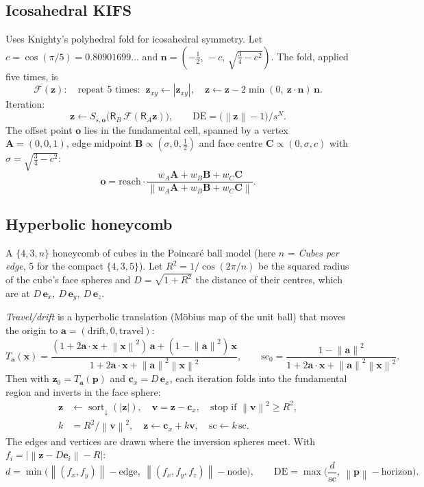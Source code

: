 \documentclass[10pt,a4paper]{article}
\newcommand{\vv}[1]{\mathbf{#1}}
\newcommand{\abs}[1]{\left|#1\right|}
\newcommand{\norm}[1]{\left\lVert#1\right\rVert}
\newcommand{\sortd}{\operatorname{sort}_{\downarrow}}
\newcommand{\Rot}{\mathsf{R}}
\newcommand{\DE}{\mathrm{DE}}
\newcommand{\ex}{\vv{e}_x}\newcommand{\ey}{\vv{e}_y}\newcommand{\ez}{\vv{e}_z}
\begin{document}
\subsection{Icosahedral KIFS}
Uses Knighty's polyhedral fold for icosahedral symmetry. Let $c=\cos(\pi/5)=0.80901699\ldots$ and
$\vv n=(-\tfrac12,\,-c,\,\sqrt{\tfrac34-c^2})$. The fold, applied five times, is
\begin{equation}
\mathcal F(\vv z):\quad\text{repeat 5 times: }\ \vv z_{xy}\leftarrow\abs{\vv z_{xy}},\quad \vv z\leftarrow\vv z-2\min(0,\ \vv z\!\cdot\!\vv n)\,\vv n.
\end{equation}
Iteration:
\begin{equation}\vv z\leftarrow S_{s,\vv o}\Big(\Rot_B\,\mathcal F(\Rot_A\vv z)\Big),\qquad\DE=\big(\norm{\vv z}-1\big)/s^{N}.
\end{equation}
The offset point $\vv o$ lies in the fundamental cell, spanned by a vertex $\vv A=(0,0,1)$, edge midpoint $\vv B\propto(\sigma,0,\tfrac12)$ and face centre $\vv C\propto(0,\sigma,c)$ with $\sigma=\sqrt{\tfrac34-c^2}$:
\begin{equation}\vv o=\mathrm{reach}\cdot\frac{w_A\vv A+w_B\vv B+w_C\vv C}{\norm{w_A\vv A+w_B\vv B+w_C\vv C}}.\end{equation}


\subsection{Hyperbolic honeycomb}
A $\{4,3,n\}$ honeycomb of cubes in the Poincar\'e ball model (here $n$ = \emph{Cubes per edge}, 5 for the compact $\{4,3,5\}$).
Let $R^2=1/\cos(2\pi/n)$ be the squared radius of the cube's face spheres and $D=\sqrt{1+R^2}$ the distance of their centres, which are at $D\,\ex,\ D\,\ey,\ D\,\ez$.

\emph{Travel/drift} is a hyperbolic translation (M\"obius map of the unit ball) that moves the origin to $\vv a=(\text{drift},0,\text{travel})$:
\begin{equation}
T_{\vv a}(\vv x)=\frac{(1+2\vv a\!\cdot\!\vv x+\norm{\vv x}^2)\,\vv a+(1-\norm{\vv a}^2)\,\vv x}{1+2\vv a\!\cdot\!\vv x+\norm{\vv a}^2\norm{\vv x}^2},\qquad
\mathrm{sc}_0=\frac{1-\norm{\vv a}^2}{1+2\vv a\!\cdot\!\vv x+\norm{\vv a}^2\norm{\vv x}^2}.
\end{equation}
Then with $\vv z_0=T_{\vv a}(\vv p)$ and $\vv c_x=D\,\ex$, each iteration folds into the fundamental region and inverts in the face sphere:
\begin{align}
\vv z&\leftarrow\sortd(\abs{\vv z}),\quad\vv v=\vv z-\vv c_x,\quad\text{stop if }\norm{\vv v}^2\ge R^2,\\
k&=R^2/\norm{\vv v}^2,\quad\vv z\leftarrow\vv c_x+k\vv v,\quad\mathrm{sc}\leftarrow k\,\mathrm{sc}.
\end{align}
The edges and vertices are drawn where the inversion spheres meet. With $f_i=\big|\norm{\vv z-D\vv e_i}-R\big|$:
\begin{equation}
d=\min\!\Big(\norm{(f_x,f_y)}-\text{edge},\ \norm{(f_x,f_y,f_z)}-\text{node}\Big),\qquad
\DE=\max\!\Big(\frac{d}{\mathrm{sc}},\ \norm{\vv p}-\text{horizon}\Big).
\end{equation}

\end{document}

